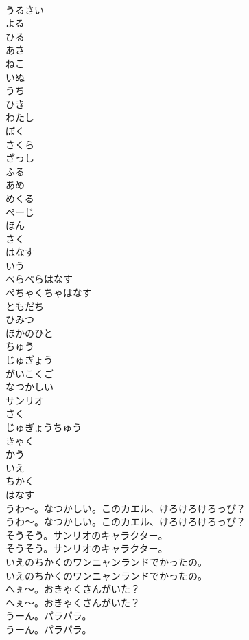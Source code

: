 \documentclass[8pt]{extreport}
\begin{document}
\begin{CJK}{UTF8}{min}
\\	うるさい
\\	よる
\\	ひる
\\	あさ
\\	ねこ
\\	いぬ
\\	うち
\\	ひき
\\	わたし
\\	ぼく
\\	さくら
\\	ざっし
\\	ふる
\\	あめ
\\	めくる
\\	ぺーじ
\\	ほん
\\	さく
\\	はなす
\\	いう
\\	ぺらぺらはなす
\\	ぺちゃくちゃはなす
\\	ともだち
\\	ひみつ
\\	ほかのひと
\\	ちゅう
\\	じゅぎょう
\\	がいこくご
\\	なつかしい
\\	サンリオ
\\	さく
\\	じゅぎょうちゅう
\\	きゃく
\\	かう
\\	いえ
\\	ちかく
\\	はなす
\\	うわ～。なつかしい。このカエル、けろけろけろっぴ？
\\	うわ～。なつかしい。このカエル、けろけろけろっぴ？
\\	そうそう。サンリオのキャラクター。
\\	そうそう。サンリオのキャラクター。
\\	いえのちかくのワンニャンランドでかったの。
\\	いえのちかくのワンニャンランドでかったの。
\\	へぇ～。おきゃくさんがいた？
\\	へぇ～。おきゃくさんがいた？
\\	うーん。パラパラ。
\\	うーん。パラパラ。

\end{CJK}
\end{document}
